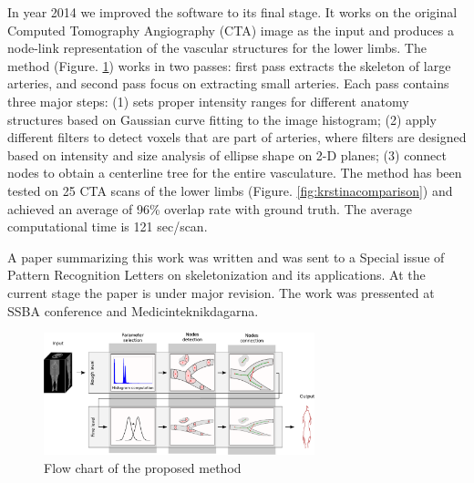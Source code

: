 \begin{enumerate}
{In year 2014 we improved the software to its final stage. It works on the original Computed Tomography Angiography (CTA) image as the input and produces a node-link representation of the vascular structures for the lower limbs. The method (Figure. \ref{fig:krstinapipeline}) works in two passes: first pass extracts the skeleton of large arteries, and second pass focus on extracting small arteries. Each pass contains three major steps: (1) sets proper intensity ranges for different anatomy structures based on Gaussian curve fitting to the image histogram; (2) apply different filters to detect voxels that are part of arteries, where filters are designed based on intensity and size analysis of ellipse shape on 2-D planes; (3) connect nodes to obtain a centerline tree for the entire vasculature. The method has been tested on 25 CTA scans of the lower limbs (Figure. \ref{fig:krstinacomparison}) and achieved an average of 96\% overlap rate with ground truth. The average computational time is 121 sec/scan.
	
A paper summarizing this work was written and was sent to a Special issue of Pattern Recognition Letters on skeletonization and its applications. At the current stage the paper is under major revision. The work was pressented at SSBA conference and Medicinteknikdagarna.}

\begin{figure}[!htbp]
\centering
\includegraphics[width=0.7\textwidth]{figures/research/kristinapipeline.pdf}
\caption{Flow chart of the proposed method}
\label{fig:krstinapipeline} 

\end{figure}


\end{enumerate}
